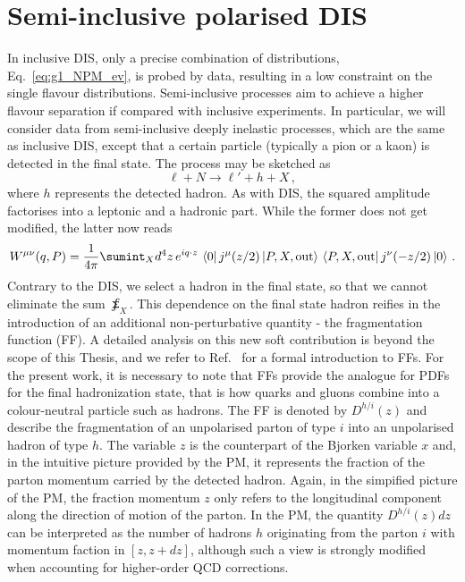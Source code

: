 \section{Semi-inclusive polarised DIS}
In inclusive DIS, only a precise combination of distributions, Eq.~\eqref{eq:g1_NPM_ev}, is probed by data, resulting in a low constraint on the single flavour distributions. Semi-inclusive processes aim to achieve a higher flavour separation if compared with inclusive experiments. In particular, we will consider data from semi-inclusive deeply inelastic processes, which are the same as inclusive DIS, except that a certain particle (typically a pion or a kaon) is detected in the final state. The process may be sketched as
\begin{equation}
  \ell + N \longrightarrow \ell' + h +  X \,,
    \label{eq:SIDIS}
\end{equation}
where $h$ represents the detected hadron. As with DIS, the squared amplitude factorises into a leptonic and a hadronic part. While the former does not get modified, the latter now reads \cite{collins_2011}
\begin{equation}
  W^{\mu \nu} (q,P) = \frac{1}{4\pi} \sumint_{X} d^4 z \, e^{i q \cdot z} \, \bra{0} j^{\mu}(z/2) \ket{P,X,\T{out}} \, \bra{P,X,\T{out}} j^{\nu}(-z/2) \ket{0}\,.
\end{equation}
Contrary to the DIS, we select a hadron in the final state, so that we cannot eliminate the sum $\sumint_{X}$. This dependence on the final state hadron reifies in the introduction of an additional non-perturbative quantity - the fragmentation function (FF). A detailed analysis on this new soft contribution is beyond the scope of this Thesis, and we refer to Ref.~\cite{Metz:2016swz} for a formal introduction to FFs. For the present work, it is necessary to note that FFs provide the analogue for PDFs for the final hadronization state, that is how quarks and gluons combine into a colour-neutral particle such as hadrons. The FF is denoted by $D^{h/i}(z)$ and describe the fragmentation of an unpolarised parton of type $i$ into an unpolarised hadron of type $h$. The variable $z$ is the counterpart of the Bjorken variable $x$ and, in the intuitive picture provided by the PM, it represents the fraction of the parton momentum carried by the detected hadron. Again, in the simpified picture of the PM, the fraction momentum $z$ only refers to the longitudinal component along the direction of motion of the parton. In the PM, the quantity $D^{h/i}(z)dz$ can be interpreted as the number of hadrons $h$ originating from the parton $i$ with momentum faction in $[z, z+dz]$, although such a view is strongly modified when accounting for higher-order QCD corrections.\par
